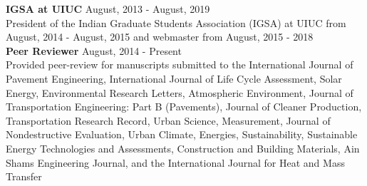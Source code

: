 \documentclass[12pt]{article}
\begin{document}
\textbf{IGSA at UIUC} \hfill August, 2013 - August, 2019 \\
President of the Indian Graduate Students Association (IGSA) at UIUC from August, 2014 - August, 2015 and webmaster from August, 2015 - 2018 \\

\textbf{Peer Reviewer} \hfill August, 2014 - Present \\
Provided peer-review for manuscripts submitted to the International Journal of Pavement Engineering, International Journal of Life Cycle Assessment, Solar Energy, Environmental Research Letters, Atmospheric Environment, Journal of Transportation Engineering: Part B (Pavements), Journal of Cleaner Production, Transportation Research Record, Urban Science, Measurement, Journal of Nondestructive Evaluation, Urban Climate, Energies, Sustainability, Sustainable Energy Technologies and Assessments, Construction and Building Materials, Ain Shams Engineering Journal, and the International Journal for Heat and Mass Transfer \\
\end{document}
